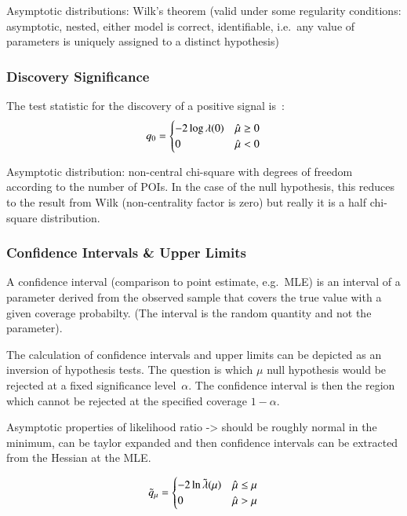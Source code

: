 Asymptotic distributions: Wilk's theorem (valid under some regularity
conditions: asymptotic, nested, either model is correct, identifiable,
i.e.\ any value of parameters is uniquely assigned to a distinct
hypothesis)



\subsubsection{Discovery Significance}


The test statistic for the discovery of a positive signal
is~\cite{Cowan:2010js}:
\begin{align}
  q_0 =
  \begin{cases}
    -2 \log \lambda(0) & \hat{\mu} \geq 0 \\
    0 & \hat{\mu} < 0
  \end{cases}
\end{align}




Asymptotic distribution: non-central chi-square with degrees of
freedom according to the number of POIs. In the case of the null
hypothesis, this reduces to the result from Wilk (non-centrality
factor is zero) but really it is a half chi-square distribution.


\subsubsection{Confidence Intervals \& Upper Limits}

A confidence interval (comparison to point estimate, e.g.\ MLE) is an
interval of a parameter derived from the observed sample that covers
the true value with a given coverage probabilty. (The interval is the
random quantity and not the parameter).

The calculation of confidence intervals and upper limits can be
depicted as an inversion of hypothesis tests. The question is which
$\mu$ null hypothesis would be rejected at a fixed significance
level~$\alpha$. The confidence interval is then the region which
cannot be rejected at the specified coverage $1 - \alpha$.

Asymptotic properties of likelihood ratio -> should be roughly normal
in the minimum, can be taylor expanded and then confidence intervals
can be extracted from the Hessian at the MLE.


\begin{align}
  \tilde{q}_\mu =
  \begin{cases}
    -2 \ln \tilde{\lambda}(\mu) & \hat{\mu} \leq \mu \\
    0 & \hat{\mu} > \mu
  \end{cases}
\end{align}

